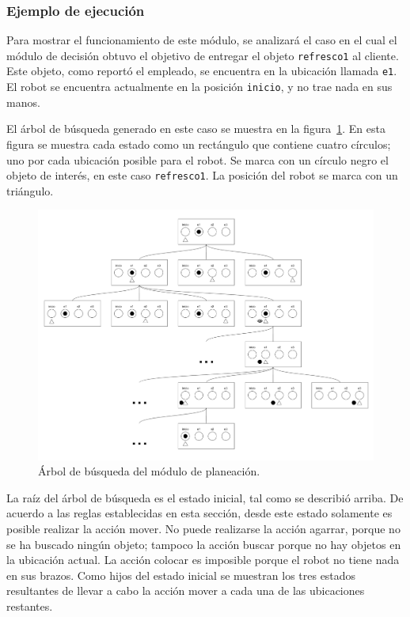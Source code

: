 \documentclass[11pt]{article}
\begin{document}
\subsubsection{Ejemplo de ejecución}

Para mostrar el funcionamiento de este módulo, se analizará el caso en el cual el módulo de decisión obtuvo el objetivo de entregar el objeto \texttt{refresco1} al cliente. Este objeto, como reportó el empleado, se encuentra en la ubicación llamada \texttt{e1}. El robot se encuentra actualmente en la posición \texttt{inicio}, y no trae nada en sus manos.

El árbol de búsqueda generado en este caso se muestra en la figura~\ref{fig:ArbolPlaneacion}. En esta figura se muestra cada estado como un rectángulo que contiene cuatro círculos; uno por cada ubicación posible para el robot. Se marca con un círculo negro el objeto de interés, en este caso \texttt{refresco1}. La posición del robot se marca con un triángulo.

\begin{figure}
    \includegraphics [width = \textwidth] {img/ArbolPlaneacion}
    \caption{Árbol de búsqueda del módulo de planeación.}
    \label{fig:ArbolPlaneacion}
\end{figure}

La raíz del árbol de búsqueda es el estado inicial, tal como se describió arriba. De acuerdo a las reglas establecidas en esta sección, desde este estado solamente es posible realizar la acción mover. No puede realizarse la acción agarrar, porque no se ha buscado ningún objeto; tampoco la acción buscar porque no hay objetos en la ubicación actual. La acción colocar es imposible porque el robot no tiene nada en sus brazos. Como hijos del estado inicial se muestran los tres estados resultantes de llevar a cabo la acción mover a cada una de las ubicaciones restantes.
\end{document}
